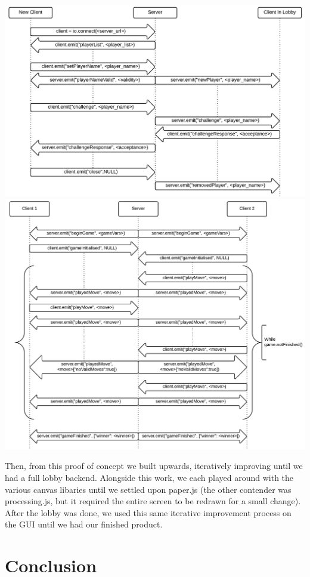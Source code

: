 \documentclass[a4wide, 11pt]{article}
\begin{document}
\includegraphics[width=\textwidth]{LobbyConnectionFlowchart.png}
\includegraphics[width=\textwidth]{GameConnectionFlowchart.png}

Then, from this proof of concept we built upwards, iteratively improving until we had a full lobby backend. Alongside this work, we each played around with the various canvas libaries until we settled upon paper.js (the other contender was processing.js, but it required the entire screen to be redrawn for a small change). After the lobby was done, we used this same iterative improvement process on the GUI until we had our finished product.

\section{Conclusion}
\end{document}
